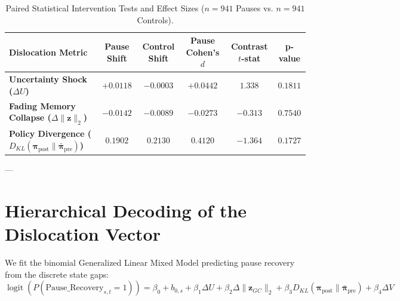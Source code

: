 \documentclass[11pt,twoside,a4paper]{article}
\begin{document}
\begin{table}[H]
\centering
\caption{Paired Statistical Intervention Tests and Effect Sizes ($n=941$ Pauses vs. $n=941$ Controls).}
\label{tab:intervention_stats}
\vspace{0.4em}
\small
\begin{tabular}{l c c c c c}
\toprule
\textbf{Dislocation Metric} & \textbf{Pause Shift} & \textbf{Control Shift} & \textbf{Pause Cohen's $d$} & \textbf{Contrast $t$-stat} & \textbf{p-value} \\
\midrule
\textbf{Uncertainty Shock ($\Delta U$)} & $\mathbf{+0.0118}$ & $\mathbf{-0.0003}$ & $\mathbf{+0.0442}$ & $\mathbf{1.338}$ & $\mathbf{0.1811}$ \\
\textbf{Fading Memory Collapse ($\Delta \|\mathbf{z}\|_2$)} & $\mathbf{-0.0142}$ & $\mathbf{-0.0089}$ & $\mathbf{-0.0273}$ & $\mathbf{-0.313}$ & $\mathbf{0.7540}$ \\
\textbf{Policy Divergence ($D_{KL}(\boldsymbol{\pi}_{\text{post}} \parallel \bar{\boldsymbol{\pi}}_{\text{pre}})$)} & $\mathbf{0.1902}$ & $\mathbf{0.2130}$ & $\mathbf{0.4120}$ & $\mathbf{-1.364}$ & $\mathbf{0.1727}$ \\
\bottomrule
\end{tabular}
\end{table}

---

\section{Hierarchical Decoding of the Dislocation Vector}

We fit the binomial Generalized Linear Mixed Model predicting pause recovery from the discrete state gaps:
\begin{equation}
\operatorname{logit}\left( P(\text{Pause\_Recovery}_{s,t} = 1) \right) = \beta_0 + b_{0,s} + \beta_1 \Delta U + \beta_2 \Delta \|\mathbf{z}_{GC}\|_2 + \beta_3 D_{KL}(\boldsymbol{\pi}_{\text{post}} \parallel \bar{\boldsymbol{\pi}}_{\text{pre}}) + \beta_4 \Delta V
\end{equation}
\end{document}

